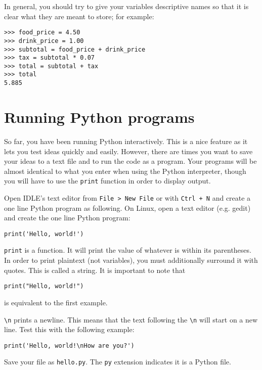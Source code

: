 \documentclass[12pt,hidelinks]{article}
\begin{document}
In general, you should try to give your variables descriptive names so that it is
clear what they are meant to store; for example:

\begin{lstlisting}[style=bash]
>>> food_price = 4.50
>>> drink_price = 1.00
>>> subtotal = food_price + drink_price
>>> tax = subtotal * 0.07
>>> total = subtotal + tax
>>> total
5.885
\end{lstlisting}

\pagebreak
\section{Running Python programs} 

So far, you have been running Python interactively. This is a nice feature as it
lets you test ideas quickly and easily. However, there are times you want to
save your ideas to a text file and to run the code as a program. Your programs
will be almost identical to what you enter when using the Python interpreter,
though you will have to use the \texttt{print} function in order to display
output.

Open IDLE's text editor from \texttt{File > New File} or with \texttt{Ctrl + N}
and create a one line Python program as following. On Linux, open a text editor
(e.g. gedit) and create the one line Python program:
\begin{lstlisting}[style=python]
print('Hello, world!')
\end{lstlisting}

\texttt{print} is a function. It will print the value of whatever is within its
parentheses. In order to print plaintext (not variables), you must additionally
surround it with quotes. This is called a string. It is important to note that
\begin{lstlisting}[style=python]
print("Hello, world!")
\end{lstlisting}
is equivalent to the first example.

\texttt{\textbackslash n} prints a newline. This means that the text following
the \texttt{\textbackslash n} will start on a new line. Test this with the
following example:
\begin{lstlisting}[style=python]
print('Hello, world!\nHow are you?')
\end{lstlisting}

Save your file as \texttt{hello.py}. The \texttt{py} extension indicates it is a
Python file.
\end{document}
